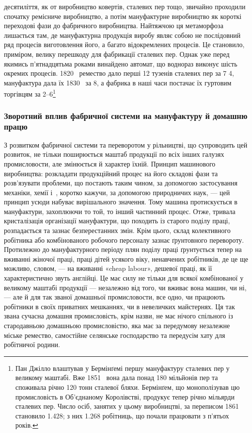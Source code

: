 \parcont{}  %
десятиліття, як от виробництво ковертів, сталевих пер тощо, звичайно
проходили спочатку ремісниче виробництво, а потім мануфактурне
виробництво як короткі переходові фази до фабричного
виробництва. Найтяжчою ця метаморфоза лишається там, де мануфактурна
продукція виробу являє собою не послідовний ряд процесів
виготовлення його, а багато відокремлених процесів. Це становило,
приміром, велику перешкоду для фабрикації сталевих пер.
Однак уже перед якимись п’ятнадцятьма роками винайдено автомат,
що воднораз виконує шість окремих процесів. 1820~ ремество
дало перші 12 тузенів сталевих пер за 7 4,
мануфактура дала їх 1830~ за 8, а фабрика в
наші часи постачає їх гуртовим торгівцям за 2--6\footnote{
Пан Джілло влаштував у Бермінґемі першу мануфактуру сталевих
пер у великому маштабі. Вже 1851~ вона дала понад 180 мільйонів пер
та споживала річно 120 тонн сталевої бляхи. Бермінґем, що монополізував
цю промисловість в Об’єднаному Королівстві, продукує тепер річно
мільярди сталевих пер. Число осіб, занятих у цьому виробництві, за
переписом 1861~ становило \num{1.428}; з них \num{1.268} робітниць, що почали
працювати з п’ятьох років.
}

\subsubsection{Зворотний вплив фабричної системи
на мануфактуру й домашню працю}

З розвитком фабричної системи та переворотом у рільництві, що
супроводить цей розвиток, не тільки поширюється маштаб продукції
по всіх інших галузях промисловости, але змінюється й характер
їхній. Принцип машинового виробництва: розкладати продукційний
процес на його складові фази та розв’язувати проблеми,
що постають таким чином, за допомогою застосування механіки,
хемії і~, коротко кажучи, за допомогою природничих наук, —
цей принцип усюди набуває вирішального значення. Тому машина
протискується в мануфактури, захоплюючи то той, то інший
частинний процес. Отже, тривала кристалізація організації мануфактури,
що походить із старого поділу праці, розпадається
та зазнає безперестанних змін. Крім цього, склад колективного
робітника або комбінованого робочого персоналу зазнає ґрунтовного
перевороту. Протилежно до мануфактурного періоду
плян поділу праці ґрунтується тепер на вживанні жіночої праці,
праці дітей усякого віку, ненавчених робітників, де це ще
можливо, словом, — на вживанні «cheap labour», дешевої праці,
як її характеристично звуть англійці. Це має силу не тільки для
всякої комбінованої у великому маштабі продукції — незалежно
від того, чи вживає вона машин, чи ні, — але й для так званої
домашньої промисловости, все одно, чи працюють робітники в
своїх приватних мешканнях, чи в невеличких майстернях. Ця
так звана сучасна домашня промисловість, крім назви, не має
нічого спільного із стародавньою домашньою промисловістю,
яка має за передумову незалежне міське ремество, самостійне
селянське господарство та передусім хату для робітничої родини.
\parbreak{}  %
